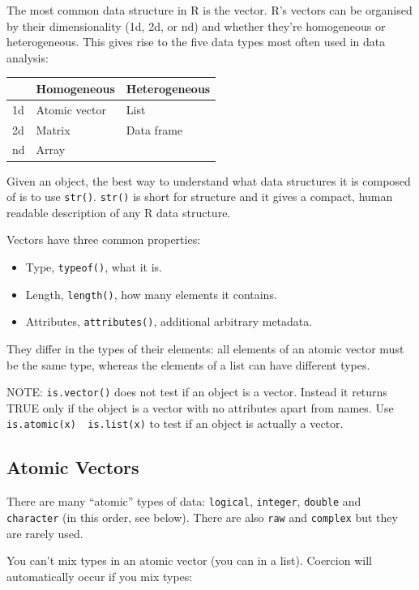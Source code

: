 \documentclass[]{book}
\providecommand{\tightlist}{%
  \setlength{\itemsep}{0pt}\setlength{\parskip}{0pt}}
\theoremstyle{definition}
\theoremstyle{definition}
\theoremstyle{definition}
\theoremstyle{remark}
\begin{document}
The most common data structure in R is the vector. R's vectors can be
organised by their dimensionality (1d, 2d, or nd) and whether they're
homogeneous or heterogeneous. This gives rise to the five data types
most often used in data analysis:

\begin{longtable}[]{@{}lll@{}}
\toprule
& Homogeneous & Heterogeneous\tabularnewline
\midrule
\endhead
1d & Atomic vector & List\tabularnewline
2d & Matrix & Data frame\tabularnewline
nd & Array &\tabularnewline
\bottomrule
\end{longtable}

Given an object, the best way to understand what data structures it is
composed of is to use \texttt{str()}. \texttt{str()} is short for
structure and it gives a compact, human readable description of any R
data structure.

Vectors have three common properties:

\begin{itemize}
\tightlist
\item
  Type, \texttt{typeof()}, what it is.
\item
  Length, \texttt{length()}, how many elements it contains.
\item
  Attributes, \texttt{attributes()}, additional arbitrary metadata.
\end{itemize}

They differ in the types of their elements: all elements of an atomic
vector must be the same type, whereas the elements of a list can have
different types.

NOTE: \texttt{is.vector()} does not test if an object is a vector.
Instead it returns TRUE only if the object is a vector with no
attributes apart from names. Use
\texttt{is.atomic(x)\ \textbar{}\textbar{}\ is.list(x)} to test if an
object is actually a vector.

\subsection{Atomic Vectors}\label{atomic-vectors}

There are many ``atomic'' types of data: \texttt{logical},
\texttt{integer}, \texttt{double} and \texttt{character} (in this order,
see below). There are also \texttt{raw} and \texttt{complex} but they
are rarely used.

You can't mix types in an atomic vector (you can in a list). Coercion
will automatically occur if you mix types:
\end{document}
